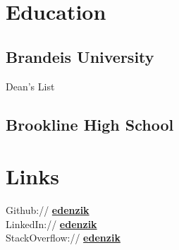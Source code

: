 \documentclass[]{deedy-resume}
\begin{document}
%
%
\lastupdated

%
%



%
%

\begin{minipage}[t]{0.33\textwidth} 


\section{Education} 

\subsection{Brandeis University}

Dean's List\\
\sectionsep

\subsection{Brookline High School}
\sectionsep


\section{Links} 
Github:// \href{https://github.com/}{\textbf{edenzik}} \\
LinkedIn://  \href{https://www.linkedin.com/in/}{\textbf{edenzik}} \\
StackOverflow://  \href{http://stackoverflow.com/users/2593964/}{\textbf{edenzik}} \\


\sectionsep


\end{minipage}
\end{document}
